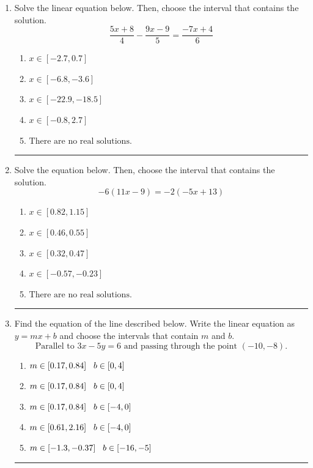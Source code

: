 \documentclass[14pt]{extbook}
\newcommand{\litem}[1]{\item#1\hspace*{-1cm}\rule{\textwidth}{0.4pt}}
\begin{document}
\begin{enumerate}
{\begin{enumerate}[label=\Alph*.]
\end{enumerate} }
\litem{
Solve the linear equation below. Then, choose the interval that contains the solution.\[ \frac{5x + 8}{4} - \frac{9x -9}{5} = \frac{-7x + 4}{6} \]\begin{enumerate}[label=\Alph*.]
\item \( x \in [-2.7, 0.7] \)
\item \( x \in [-6.8, -3.6] \)
\item \( x \in [-22.9, -18.5] \)
\item \( x \in [-0.8, 2.7] \)
\item \( \text{There are no real solutions.} \)

\end{enumerate} }
\litem{
Solve the equation below. Then, choose the interval that contains the solution.\[ -6(11x -9) = -2(-5x + 13) \]\begin{enumerate}[label=\Alph*.]
\item \( x \in [0.82, 1.15] \)
\item \( x \in [0.46, 0.55] \)
\item \( x \in [0.32, 0.47] \)
\item \( x \in [-0.57, -0.23] \)
\item \( \text{There are no real solutions.} \)

\end{enumerate} }
\litem{
Find the equation of the line described below. Write the linear equation as $ y=mx+b $ and choose the intervals that contain $m$ and $b$.\[ \text{Parallel to } 3 x - 5 y = 6 \text{ and passing through the point } (-10, -8). \]\begin{enumerate}[label=\Alph*.]
\item \( m \in [0.17, 0.84] \hspace*{3mm} b \in [0, 4] \)
\item \( m \in [0.17, 0.84] \hspace*{3mm} b \in [0, 4] \)
\item \( m \in [0.17, 0.84] \hspace*{3mm} b \in [-4, 0] \)
\item \( m \in [0.61, 2.16] \hspace*{3mm} b \in [-4, 0] \)
\item \( m \in [-1.3, -0.37] \hspace*{3mm} b \in [-16, -5] \)


\end{enumerate}}
\end{enumerate}
\end{document}
